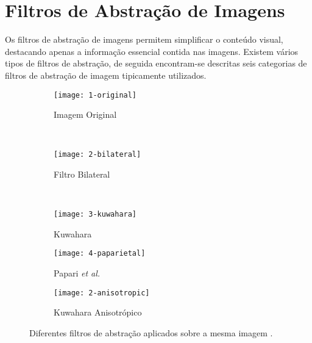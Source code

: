 \section{Filtros de Abstração de Imagens}
Os filtros de abstração de imagens permitem simplificar o conteúdo visual, destacando apenas a informação essencial contida nas imagens. Existem vários tipos de filtros de abstração, de seguida encontram-se descritas seis categorias de filtros de abstração de imagem tipicamente utilizados.
\begin{figure}
        \centering
        \begin{subfigure}[b]{0.3\textwidth}
                \centering
                \texttt{[image: 1-original]}
                \caption{Imagem Original}
                \label{fig:original}
        \end{subfigure}%
        ~ %
        \begin{subfigure}[b]{0.3\textwidth}
                \centering
                \texttt{[image: 2-bilateral]}
                \caption{Filtro Bilateral}
                \label{fig:bilateral_k}
        \end{subfigure}
        ~ %
        \begin{subfigure}[b]{0.3\textwidth}
                \centering
                \texttt{[image: 3-kuwahara]}
                \caption{Kuwahara}
                \label{fig:kuwahara}
        \end{subfigure}
        \begin{subfigure}[b]{0.3\textwidth}
                \centering
                \texttt{[image: 4-paparietal]}
                \caption{Papari \textit{et al.}}
                \label{fig:papari}
        \end{subfigure}
        \begin{subfigure}[b]{0.3\textwidth}
                \centering
                \texttt{[image: 2-anisotropic]}
                \caption{Kuwahara Anisotrópico}
                \label{fig:anisotropic}
        \end{subfigure}
        \caption{Diferentes filtros de abstração aplicados sobre a mesma imagem \cite{Kyprianidis2009}.}\label{fig:filtrosabtracao}
\end{figure}

